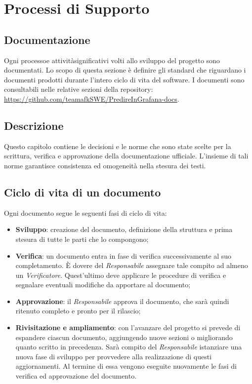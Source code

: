 \section{Processi di Supporto}
\subsection{Documentazione}
Ogni processo\glo e attività\glo significativi volti allo sviluppo del progetto sono documentati. Lo scopo di questa sezione è definire gli standard che riguardano i documenti prodotti durante l'intero ciclo di vita del software. I documenti sono consultabili nelle relative sezioni della repository\glo: \url{https://github.com/teamafkSWE/PredireInGrafana-docs}. 		

\subsection{Descrizione}
Questo capitolo contiene le decisioni e le norme che sono state scelte per la scrittura, verifica e approvazione della documentazione ufficiale. L'insieme di tali norme garantisce consistenza ed omogeneità nella stesura dei testi.

\subsection{Ciclo di vita di un documento}
Ogni documento segue le seguenti fasi di ciclo di vita:
\begin{itemize}
\item \textbf{Sviluppo}: creazione del documento, definizione della struttura e prima stesura di tutte le parti che lo compongono;
\item \textbf{Verifica}: un documento entra in fase di verifica successivamente al suo completamento. È dovere del \textit{Responsabile} assegnare tale compito ad almeno un \textit{Verificatore}. Quest'ultimo deve applicare le procedure di verifica e segnalare eventuali modifiche da apportare al documento;
\item \textbf{Approvazione}: il \textit{Responsabile} approva il documento, che sarà quindi ritenuto completo e pronto per il rilascio;
\item \textbf{Rivisitazione e ampliamento}: con l'avanzare del progetto si prevede di espandere ciascun documento, aggiungendo nuove sezioni o migliorando quanto scritto in precedenza. Sarà compito del \textit{Responsabile} istanziare una nuova fase di sviluppo per provvedere alla realizzazione di questi aggiornamenti. Al termine di essa vengono eseguite nuovamente le fasi di verifica ed approvazione del documento.
\end{itemize}

